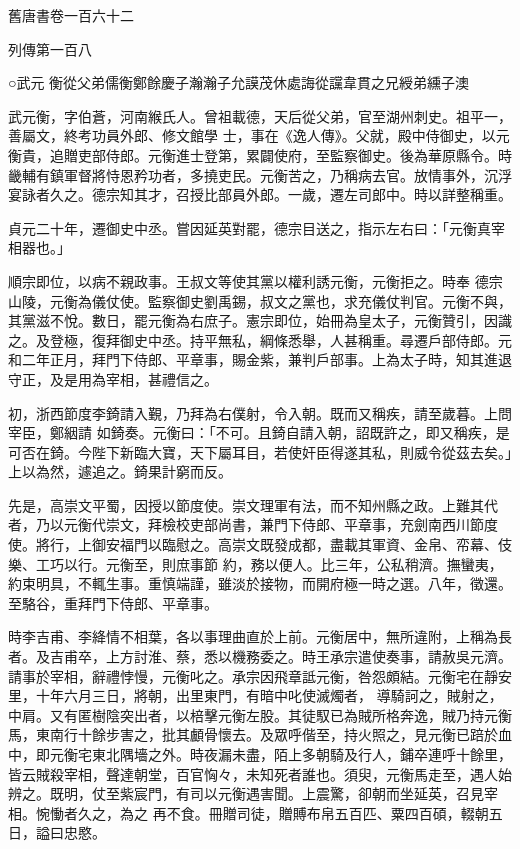 
\begin{pinyinscope}

 舊唐書卷一百六十二



 列傳第一百八



 ○武元
 衡從父弟儒衡鄭餘慶子瀚瀚子允謨茂休處誨從讜韋貫之兄綬弟纁子澳



 武元衡，字伯蒼，河南緱氏人。曾祖載德，天后從父弟，官至湖州刺史。祖平一，善屬文，終考功員外郎、修文館學
 士，事在《逸人傳》。父就，殿中侍御史，以元衡貴，追贈吏部侍郎。元衡進士登第，累闢使府，至監察御史。後為華原縣令。時畿輔有鎮軍督將恃恩矜功者，多撓吏民。元衡苦之，乃稱病去官。放情事外，沉浮宴詠者久之。德宗知其才，召授比部員外郎。一歲，遷左司郎中。時以詳整稱重。



 貞元二十年，遷御史中丞。嘗因延英對罷，德宗目送之，指示左右曰：「元衡真宰相器也。」



 順宗即位，以病不親政事。王叔文等使其黨以權利誘元衡，元衡拒之。時奉
 德宗山陵，元衡為儀仗使。監察御史劉禹錫，叔文之黨也，求充儀仗判官。元衡不與，其黨滋不悅。數日，罷元衡為右庶子。憲宗即位，始冊為皇太子，元衡贊引，因識之。及登極，復拜御史中丞。持平無私，綱條悉舉，人甚稱重。尋遷戶部侍郎。元和二年正月，拜門下侍郎、平章事，賜金紫，兼判戶部事。上為太子時，知其進退守正，及是用為宰相，甚禮信之。



 初，浙西節度李錡請入覲，乃拜為右僕射，令入朝。既而又稱疾，請至歲暮。上問宰臣，鄭絪請
 如錡奏。元衡曰：「不可。且錡自請入朝，詔既許之，即又稱疾，是可否在錡。今陛下新臨大寶，天下屬耳目，若使奸臣得遂其私，則威令從茲去矣。」上以為然，遽追之。錡果計窮而反。



 先是，高崇文平蜀，因授以節度使。崇文理軍有法，而不知州縣之政。上難其代者，乃以元衡代崇文，拜檢校吏部尚書，兼門下侍郎、平章事，充劍南西川節度使。將行，上御安福門以臨慰之。高崇文既發成都，盡載其軍資、金帛、帟幕、伎樂、工巧以行。元衡至，則庶事節
 約，務以便人。比三年，公私稍濟。撫蠻夷，約束明具，不輒生事。重慎端謹，雖淡於接物，而開府極一時之選。八年，徵還。至駱谷，重拜門下侍郎、平章事。



 時李吉甫、李絳情不相葉，各以事理曲直於上前。元衡居中，無所違附，上稱為長者。及吉甫卒，上方討淮、蔡，悉以機務委之。時王承宗遣使奏事，請赦吳元濟。請事於宰相，辭禮悖慢，元衡叱之。承宗因飛章詆元衡，咎怨頗結。元衡宅在靜安里，十年六月三日，將朝，出里東門，有暗中叱使滅燭者，
 導騎訶之，賊射之，中肩。又有匿樹陰突出者，以棓擊元衡左股。其徒馭已為賊所格奔逸，賊乃持元衡馬，東南行十餘步害之，批其顱骨懷去。及眾呼偕至，持火照之，見元衡已踣於血中，即元衡宅東北隅墻之外。時夜漏未盡，陌上多朝騎及行人，鋪卒連呼十餘里，皆云賊殺宰相，聲達朝堂，百官恟々，未知死者誰也。須臾，元衡馬走至，遇人始辨之。既明，仗至紫宸門，有司以元衡遇害聞。上震驚，卻朝而坐延英，召見宰相。惋慟者久之，為之
 再不食。冊贈司徒，贈賻布帛五百匹、粟四百碩，輟朝五日，謚曰忠愍。




\end{pinyinscope}
